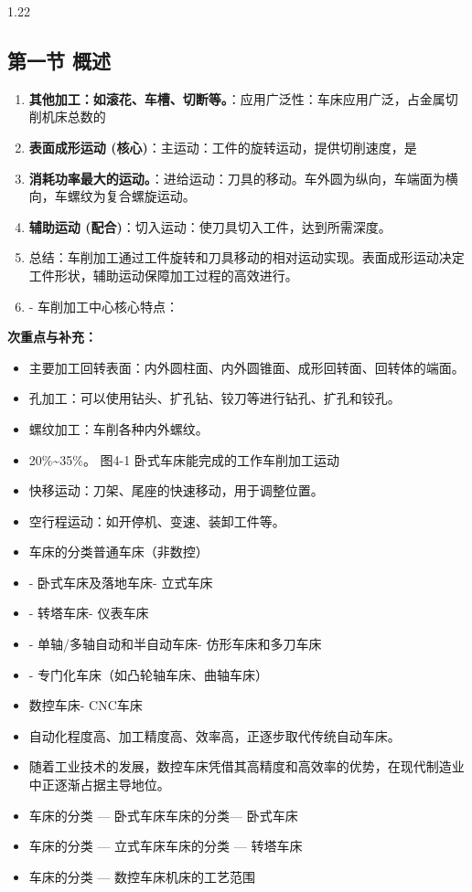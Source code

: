 \documentclass[12pt,a4paper]{article}
\begin{document}
\begin{spacing}{1.22}
\subsection{第一节 概述}
\begin{tcolorbox}[colback=yellow!6,colframe=red!55!black,title=重点,left=1mm,right=1mm]
\begin{enumerate}[leftmargin=2.2em,label=\arabic*.]
  \item \textbf{其他加工：如滚花、车槽、切断等。}：应用广泛性：车床应用广泛，占金属切削机床总数的
  \item \textbf{表面成形运动 (核心)}：主运动：工件的旋转运动，提供切削速度，是
  \item \textbf{消耗功率最大的运动。}：进给运动：刀具的移动。车外圆为纵向，车端面为横向，车螺纹为复合螺旋运动。
  \item \textbf{辅助运动 (配合)}：切入运动：使刀具切入工件，达到所需深度。
  \item 总结：车削加工通过工件旋转和刀具移动的相对运动实现。表面成形运动决定工件形状，辅助运动保障加工过程的高效进行。
  \item - 车削加工中心核心特点：
\end{enumerate}
\end{tcolorbox}
\noindent\textbf{次重点与补充：}
\begin{itemize}[leftmargin=2.2em,label=--]
  \item 主要加工回转表面：内外圆柱面、内外圆锥面、成形回转面、回转体的端面。
  \item 孔加工：可以使用钻头、扩孔钻、铰刀等进行钻孔、扩孔和铰孔。
  \item 螺纹加工：车削各种内外螺纹。
  \item 20\%\textasciitilde{}35\%。 图4-1 卧式车床能完成的工作车削加工运动
  \item 快移运动：刀架、尾座的快速移动，用于调整位置。
  \item 空行程运动：如开停机、变速、装卸工件等。
  \item 车床的分类普通车床（非数控）
  \item - 卧式车床及落地车床- 立式车床
  \item - 转塔车床- 仪表车床
  \item - 单轴/多轴自动和半自动车床- 仿形车床和多刀车床
  \item - 专门化车床（如凸轮轴车床、曲轴车床）
  \item 数控车床- CNC车床
  \item 自动化程度高、加工精度高、效率高，正逐步取代传统自动车床。
  \item 随着工业技术的发展，数控车床凭借其高精度和高效率的优势，在现代制造业中正逐渐占据主导地位。
  \item 车床的分类 — 卧式车床车床的分类— 卧式车床
  \item 车床的分类 — 立式车床车床的分类 — 转塔车床
  \item 车床的分类 — 数控车床机床的工艺范围
\end{itemize}


\end{spacing}
\end{document}
